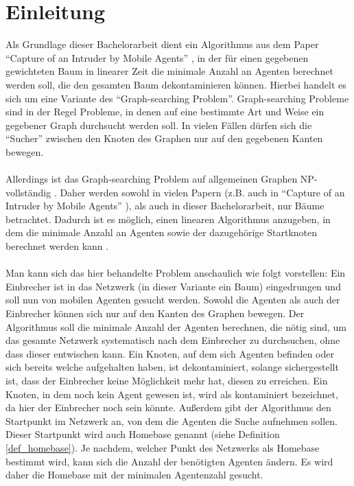 \section{Einleitung}

Als Grundlage dieser Bachelorarbeit dient ein Algorithmus aus dem Paper "`Capture of an Intruder by Mobile Agents"' \cite{cima_paper}, in der für einen gegebenen gewichteten Baum in linearer Zeit die minimale Anzahl an Agenten berechnet werden soll, die den gesamten Baum dekontaminieren können. Hierbei handelt es sich um eine Variante des "`Graph-searching Problem"'. Graph-searching Probleme sind in der Regel Probleme, in denen auf eine bestimmte Art und Weise ein gegebener Graph durchsucht werden soll. In vielen Fällen dürfen sich die "`Sucher"' zwischen den Knoten des Graphen nur auf den gegebenen Kanten bewegen.
\\
\\
Allerdings ist das Graph-searching Problem auf allgemeinen Graphen NP-vollständig \cite{complexity_paper}. Daher werden sowohl in vielen Papern (z.B. auch in "`Capture of an Intruder by Mobile Agents"' \cite{cima_paper}), als auch in dieser Bachelorarbeit, nur Bäume betrachtet. Dadurch ist es möglich, einen linearen Algorithmus anzugeben, in dem die minimale Anzahl an Agenten sowie der dazugehörige Startknoten berechnet werden kann	.
\\
\\
Man kann sich das hier behandelte Problem anschaulich wie folgt vorstellen: Ein Einbrecher ist in das Netzwerk (in dieser Variante ein Baum) eingedrungen und soll nun von mobilen Agenten gesucht werden. Sowohl die Agenten als auch der Einbrecher können sich nur auf den Kanten des Graphen bewegen. Der Algorithmus soll die minimale Anzahl der Agenten berechnen, die nötig sind, um das gesamte Netzwerk systematisch nach dem Einbrecher zu durchsuchen, ohne dass dieser entwischen kann. Ein Knoten, auf dem sich Agenten befinden oder sich bereits welche aufgehalten haben, ist dekontaminiert, solange sichergestellt ist, dass der Einbrecher keine Möglichkeit mehr hat, diesen zu erreichen. Ein Knoten, in dem noch kein Agent gewesen ist, wird als kontaminiert bezeichnet, da hier der Einbrecher noch sein könnte. Außerdem gibt der Algorithmus den Startpunkt im Netzwerk an, von dem die Agenten die Suche aufnehmen sollen. Dieser Startpunkt wird auch Homebase genannt (siehe Definition \ref{def_homebase}). Je nachdem, welcher Punkt des Netzwerks als Homebase bestimmt wird, kann sich die Anzahl der benötigten Agenten ändern. Es wird daher die Homebase mit der minimalen Agentenzahl gesucht.
